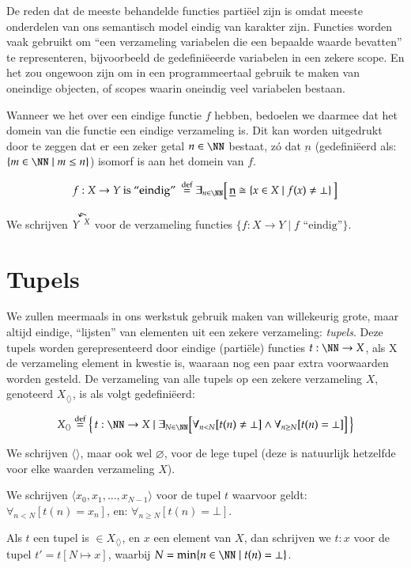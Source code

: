 De reden dat de meeste behandelde functies partiëel zijn is omdat meeste onderdelen van ons semantisch model eindig van karakter zijn. Functies worden vaak gebruikt om ``een verzameling variabelen die een bepaalde waarde bevatten'' te representeren, bijvoorbeeld de gedefiniëeerde variabelen in een zekere scope. En het zou ongewoon zijn om in een programmeertaal gebruik te maken van oneindige objecten, of scopes waarin oneindig veel variabelen bestaan.

Wanneer we het over een eindige functie $f$ hebben, bedoelen we daarmee dat het domein van die functie een eindige verzameling is. Dit kan worden uitgedrukt door te zeggen dat er een zeker getal $n \in \NN$ bestaat, zó dat $\underbar{n}$ (gedefiniëerd als: $\{m \in \NN \mid m \le n\}$) isomorf is aan het domein van $f$.

$$ f : X \to Y \text{ is ``eindig'' } \DEF \exists_{n \in \NN} \surr{ \underbar{n} \cong \{ x \in X \mid f(x) \neq \bot \} } $$

We schrijven $\FiniteFunctions{Y}{X}$ voor de verzameling functies $\{f : X \to Y \mid f \text{ ``eindig''} \}$.

\section{Tupels}

We zullen meermaals in ons werkstuk gebruik maken van willekeurig grote, maar altijd eindige, ``lijsten'' van elementen uit een zekere verzameling: \emph{tupels}. Deze tupels worden gerepresenteerd door eindige (partiële) functies $t : \NN \to X$, als X de verzameling element in kwestie is, waaraan nog een paar extra voorwaarden worden gesteld. De verzameling van alle tupels op een zekere verzameling $X$, genoteerd $X_{\langle\rangle}$, is als volgt gedefiniëerd:

$$ X_{\langle\rangle} \DEF \big\{\, t : \NN \to X \mid \exists_{N \in \NN} \big[ \forall_{n < N}[t(n) \neq \bot] \land \forall_{n\ge N}[t(n) = \bot] \big] \,\big\} $$

We schrijven $\langle\rangle$, maar ook wel $\varnothing$, voor de lege tupel (deze is natuurlijk hetzelfde voor elke waarden verzameling $X$).

We schrijven $\langle x_0, x_1, \dots, x_{N-1}\rangle$ voor de tupel $t$ waarvoor geldt: $\forall_{n < N}[t(n) = x_n]$, en: $\forall_{n \ge N}[t(n) = \bot]$.

Als $t$ een tupel is $\in X_{\langle\rangle}$, en $x$ een element van $X$, dan schrijven we $t:x$ voor de tupel $t' = t[N \mapsto x]$, waarbij $N = \min\{n\in\NN \mid t(n) = \bot\}$.

